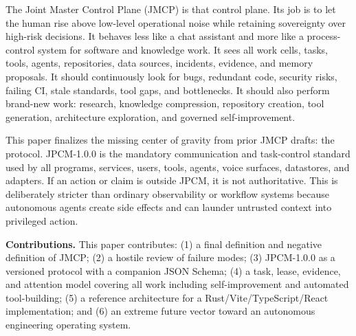 \documentclass[10pt,journal,onecolumn]{IEEEtran}
\begin{document}
The Joint Master Control Plane (JMCP) is that control plane. Its job is to let the human rise above low-level operational noise while retaining sovereignty over high-risk decisions. It behaves less like a chat assistant and more like a process-control system for software and knowledge work. It sees all work cells, tasks, tools, agents, repositories, data sources, incidents, evidence, and memory proposals. It should continuously look for bugs, redundant code, security risks, failing CI, stale standards, tool gaps, and bottlenecks. It should also perform brand-new work: research, knowledge compression, repository creation, tool generation, architecture exploration, and governed self-improvement.

This paper finalizes the missing center of gravity from prior JMCP drafts: the protocol. JPCM-1.0.0 is the mandatory communication and task-control standard used by all programs, services, users, tools, agents, voice surfaces, datastores, and adapters. If an action or claim is outside JPCM, it is not authoritative. This is deliberately stricter than ordinary observability or workflow systems because autonomous agents create side effects and can launder untrusted context into privileged action.

\textbf{Contributions.} This paper contributes: (1) a final definition and negative definition of JMCP; (2) a hostile review of failure modes; (3) JPCM-1.0.0 as a versioned protocol with a companion JSON Schema; (4) a task, lease, evidence, and attention model covering all work including self-improvement and automated tool-building; (5) a reference architecture for a Rust/Vite/TypeScript/React implementation; and (6) an extreme future vector toward an autonomous engineering operating system.
\end{document}
